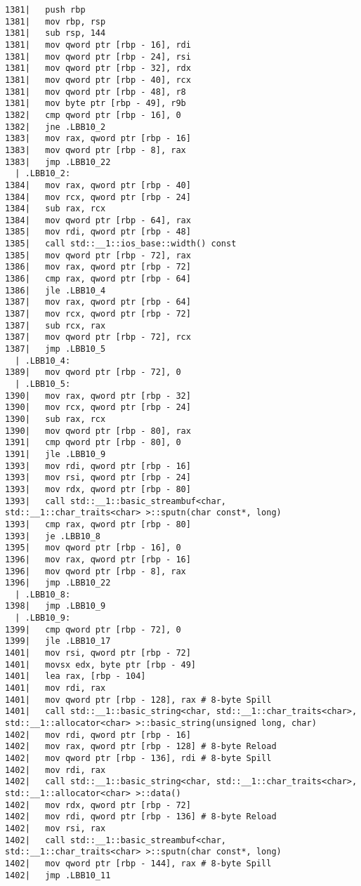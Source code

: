 \begin{lstlisting}[language={},numbers=none,title=\href{https://godbolt.org/z/hwKje8}{\texttt{godbolt.org/z/hwKje8}}]
1381|   push rbp
1381|   mov rbp, rsp
1381|   sub rsp, 144
1381|   mov qword ptr [rbp - 16], rdi
1381|   mov qword ptr [rbp - 24], rsi
1381|   mov qword ptr [rbp - 32], rdx
1381|   mov qword ptr [rbp - 40], rcx
1381|   mov qword ptr [rbp - 48], r8
1381|   mov byte ptr [rbp - 49], r9b
1382|   cmp qword ptr [rbp - 16], 0
1382|   jne .LBB10_2
1383|   mov rax, qword ptr [rbp - 16]
1383|   mov qword ptr [rbp - 8], rax
1383|   jmp .LBB10_22
  | .LBB10_2:
1384|   mov rax, qword ptr [rbp - 40]
1384|   mov rcx, qword ptr [rbp - 24]
1384|   sub rax, rcx
1384|   mov qword ptr [rbp - 64], rax
1385|   mov rdi, qword ptr [rbp - 48]
1385|   call std::__1::ios_base::width() const
1385|   mov qword ptr [rbp - 72], rax
1386|   mov rax, qword ptr [rbp - 72]
1386|   cmp rax, qword ptr [rbp - 64]
1386|   jle .LBB10_4
1387|   mov rax, qword ptr [rbp - 64]
1387|   mov rcx, qword ptr [rbp - 72]
1387|   sub rcx, rax
1387|   mov qword ptr [rbp - 72], rcx
1387|   jmp .LBB10_5
  | .LBB10_4:
1389|   mov qword ptr [rbp - 72], 0
  | .LBB10_5:
1390|   mov rax, qword ptr [rbp - 32]
1390|   mov rcx, qword ptr [rbp - 24]
1390|   sub rax, rcx
1390|   mov qword ptr [rbp - 80], rax
1391|   cmp qword ptr [rbp - 80], 0
1391|   jle .LBB10_9
1393|   mov rdi, qword ptr [rbp - 16]
1393|   mov rsi, qword ptr [rbp - 24]
1393|   mov rdx, qword ptr [rbp - 80]
1393|   call std::__1::basic_streambuf<char, std::__1::char_traits<char> >::sputn(char const*, long)
1393|   cmp rax, qword ptr [rbp - 80]
1393|   je .LBB10_8
1395|   mov qword ptr [rbp - 16], 0
1396|   mov rax, qword ptr [rbp - 16]
1396|   mov qword ptr [rbp - 8], rax
1396|   jmp .LBB10_22
  | .LBB10_8:
1398|   jmp .LBB10_9
  | .LBB10_9:
1399|   cmp qword ptr [rbp - 72], 0
1399|   jle .LBB10_17
1401|   mov rsi, qword ptr [rbp - 72]
1401|   movsx edx, byte ptr [rbp - 49]
1401|   lea rax, [rbp - 104]
1401|   mov rdi, rax
1401|   mov qword ptr [rbp - 128], rax # 8-byte Spill
1401|   call std::__1::basic_string<char, std::__1::char_traits<char>, std::__1::allocator<char> >::basic_string(unsigned long, char)
1402|   mov rdi, qword ptr [rbp - 16]
1402|   mov rax, qword ptr [rbp - 128] # 8-byte Reload
1402|   mov qword ptr [rbp - 136], rdi # 8-byte Spill
1402|   mov rdi, rax
1402|   call std::__1::basic_string<char, std::__1::char_traits<char>, std::__1::allocator<char> >::data()
1402|   mov rdx, qword ptr [rbp - 72]
1402|   mov rdi, qword ptr [rbp - 136] # 8-byte Reload
1402|   mov rsi, rax
1402|   call std::__1::basic_streambuf<char, std::__1::char_traits<char> >::sputn(char const*, long)
1402|   mov qword ptr [rbp - 144], rax # 8-byte Spill
1402|   jmp .LBB10_11

\end{lstlisting}
